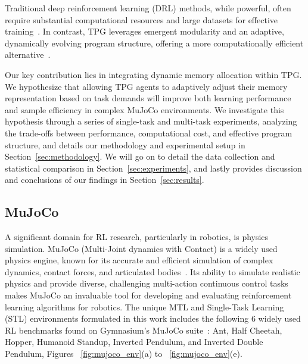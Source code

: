 \documentclass[sigconf]{acmart}
\begin{document}
Traditional deep reinforcement learning (DRL) methods, while powerful, often require substantial 
computational resources and large datasets for effective training~\cite{Mnih07}. 
In contrast, TPG leverages emergent modularity and an adaptive, dynamically evolving 
program structure, offering a more computationally efficient alternative~\cite{Kelly21}. 

Our key contribution lies in integrating dynamic memory allocation within TPG. We hypothesize 
that allowing TPG agents to adaptively adjust their memory representation based on task demands 
will improve both learning performance and sample efficiency in complex MuJoCo environments. 
We investigate this hypothesis through a series of single-task and multi-task experiments, 
analyzing the trade-offs between performance, computational cost, and effective program structure, 
and details our methodology and experimental setup in Section~\ref{sec:methodology}. We will go on to detail the 
data collection and statistical comparison in Section~\ref{sec:experiments}, and lastly provides discussion and 
conclusions of our findings in Section~\ref{sec:results}.


\subsection{MuJoCo}
A significant domain for RL research, particularly in robotics, is physics 
simulation. MuJoCo (Multi-Joint dynamics with Contact) is a widely used physics 
engine, known for its accurate and efficient simulation of complex dynamics, 
contact forces, and articulated bodies~\cite{Todorov07}. Its ability to simulate realistic 
physics and provide diverse, challenging multi-action continuous control tasks makes MuJoCo an invaluable 
tool for developing and evaluating reinforcement learning algorithms for robotics. 
The unique MTL and Single-Task Learning (STL) environments formulated in this work 
includes the following 6 widely used RL benchmarks found on Gymnasium's 
MuJoCo suite~\cite{Towers07}: Ant, Half Cheetah, Hopper, Humanoid Standup, 
Inverted Pendulum, and Inverted Double Pendulum, Figures ~\ref{fig:mujoco_env}(a) to ~\ref{fig:mujoco_env}(e).
\end{document}
